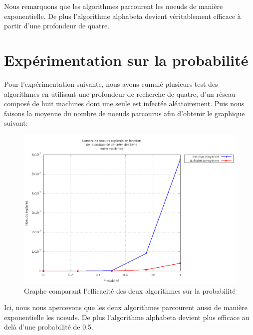 \documentclass[12pt, a4paper]{article}
\begin{document}
        Nous remarquons que les algorithmes parcourent les noeuds de manière exponentielle. De plus l'algorithme alphabeta devient véritablement efficace à partir d'une profondeur de quatre.
        
    \newpage
    \section{Expérimentation sur la probabilité}
        Pour l'expérimentation suivante, nous avons cumulé plusieurs test des algorithmes en utilisant une profondeur de recherche de quatre, d'un réseau composé de huit machines dont une seule est infectée aléatoirement. Puis nous faisons la moyenne du nombre de noeuds parcourus afin d'obtenir le graphique suivant:
        
        \begin{figure}[h]
            \centering
            \includegraphics[scale=0.6]{img/graph2.png}
            \caption{Graphe comparant l'efficacité des deux algorithmes sur la probabilité}
            \label{fig3}
        \end{figure}
        
        Ici, nous nous apercevons que les deux algorithmes parcourent aussi de manière exponentielle les noeuds. De plus l'algorithme alphabeta devient plus efficace au delà d'une probabilité de 0.5.
        
\end{document}
